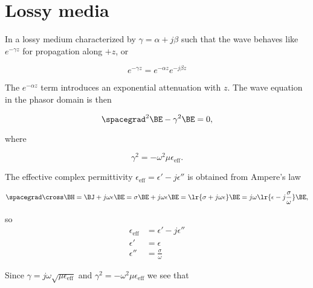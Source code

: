 %
%
\section{Lossy media}

In a lossy medium characterized by \( \gamma = \alpha + j \beta \) such that the wave behaves like \( e^{-\gamma z } \) for propagation along \( +z \), or 

\begin{equation}\label{eqn:uwavesLecture3:20}
e^{-\gamma z} = e^{-\alpha z} e^{-j \beta z}
\end{equation}

The \( e^{-\alpha z} \) term introduces an exponential attenuation with \( z \).  The wave equation in the phasor domain is then

\begin{equation}\label{eqn:uwavesLecture3:40}
\spacegrad^2 \BE - \gamma^2 \BE = 0,
\end{equation}

where 

\begin{equation}\label{eqn:uwavesLecture3:60}
\gamma^2 = - \omega^2 \mu \epsilon_{\mathrm{eff}}.
\end{equation}

The effective complex permittivity \( \epsilon_{\mathrm{eff}} = \epsilon' -j \epsilon'' \) is obtained from Ampere's law

\begin{dmath}\label{eqn:uwavesLecture3:80}
\spacegrad \cross \BH 
= \BJ + j \omega \epsilon \BE
= \sigma \BE + j \omega \epsilon \BE
= \lr{ \sigma + j \omega \epsilon } \BE 
= j \omega \lr{ \epsilon -j \frac{\sigma}{\omega} } \BE ,
\end{dmath}

so
\begin{equation}\label{eqn:uwavesLecture3:100}
\begin{aligned}
\epsilon_{\mathrm{eff}} &= \epsilon' -j \epsilon'' \\
\epsilon' &= \epsilon \\
\epsilon'' &= \frac{\sigma}{\omega}
\end{aligned}
\end{equation}

Since \( \gamma = j \omega \sqrt{ \mu \epsilon_{\mathrm{eff}} } \) and \( \gamma^2 = -\omega^2 \mu \epsilon_{\mathrm{eff}} \) we see that

